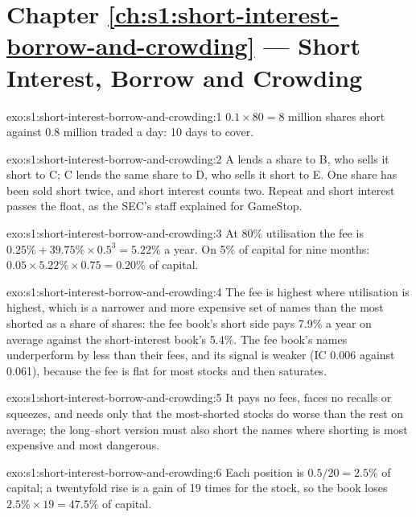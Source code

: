 \section*{Chapter \ref{ch:s1:short-interest-borrow-and-crowding} --- Short Interest, Borrow and Crowding}

\begin{solution}{exo:s1:short-interest-borrow-and-crowding:1}
$0.1 \times 80 = 8$ million shares short against 0.8 million traded a day: 10 days to cover.
\end{solution}

\begin{solution}{exo:s1:short-interest-borrow-and-crowding:2}
A lends a share to B, who sells it short to C; C lends the same share to D, who sells it short to E. One share has been sold short twice, and short interest
counts two. Repeat and short interest passes the float, as the SEC's staff explained for GameStop.
\end{solution}

\begin{solution}{exo:s1:short-interest-borrow-and-crowding:3}
At 80\% utilisation the fee is $0.25\% + 39.75\% \times 0.5^3 = 5.22\%$ a year. On 5\% of capital for nine months: $0.05 \times 5.22\% \times 0.75 = 0.20\%$ of
capital.
\end{solution}

\begin{solution}{exo:s1:short-interest-borrow-and-crowding:4}
The fee is highest where utilisation is highest, which is a narrower and more expensive set of names than the most shorted as a share of shares: the fee
book's short side pays 7.9\% a year on average against the short-interest book's 5.4\%. The fee book's names underperform by less than their fees, and its
signal is weaker (IC 0.006 against 0.061), because the fee is flat for most stocks and then saturates.
\end{solution}

\begin{solution}{exo:s1:short-interest-borrow-and-crowding:5}
It pays no fees, faces no recalls or squeezes, and needs only that the most-shorted stocks do worse than the rest on average; the long--short version must
also short the names where shorting is most expensive and most dangerous.
\end{solution}

\begin{solution}{exo:s1:short-interest-borrow-and-crowding:6}
Each position is $0.5/20 = 2.5\%$ of capital; a twentyfold rise is a gain of 19 times for the stock, so the book loses $2.5\% \times 19 = 47.5\%$ of capital.
\end{solution}

